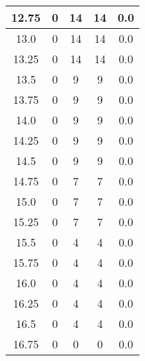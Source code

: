 \documentclass[letterpaper, 12pt]{article}
\begin{document}
\begin{longtable}{|c|c|c|c|c|}
\hline
12.75 & 0 & 14 & 14 & 0.0 \\
\hline
13.0 & 0 & 14 & 14 & 0.0 \\
\hline
13.25 & 0 & 14 & 14 & 0.0 \\
\hline
13.5 & 0 & 9 & 9 & 0.0 \\
\hline
13.75 & 0 & 9 & 9 & 0.0 \\
\hline
14.0 & 0 & 9 & 9 & 0.0 \\
\hline
14.25 & 0 & 9 & 9 & 0.0 \\
\hline
14.5 & 0 & 9 & 9 & 0.0 \\
\hline
14.75 & 0 & 7 & 7 & 0.0 \\
\hline
15.0 & 0 & 7 & 7 & 0.0 \\
\hline
15.25 & 0 & 7 & 7 & 0.0 \\
\hline
15.5 & 0 & 4 & 4 & 0.0 \\
\hline
15.75 & 0 & 4 & 4 & 0.0 \\
\hline
16.0 & 0 & 4 & 4 & 0.0 \\
\hline
16.25 & 0 & 4 & 4 & 0.0 \\
\hline
16.5 & 0 & 4 & 4 & 0.0 \\
\hline
16.75 & 0 & 0 & 0 & 0.0 \\
\hline
\end{longtable}
\end{document}
